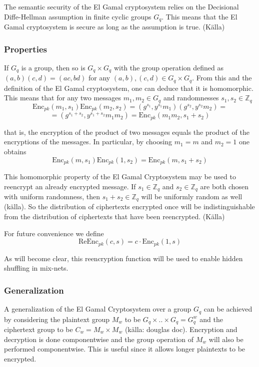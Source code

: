 The semantic security of the El Gamal cryptosystem relies on the
Decisional Diffe-Hellman assumption in finite cyclic groups
$G_q$. This means that the El Gamal cryptosystem is secure as long as
the assumption is true. (Källa)

\subsubsection{Properties}
If $G_q$ is a group, then so is $G_q \times G_q$ with the group
operation defined as $(a,b)(c,d) = (a c, b d)$ for any $(a,b),(c,d)
\in G_q \times G_q$. From this and the definition of the El Gamal
cryptosystem, one can deduce that it is homomorphic. This means that
for any two messages $m_1, m_2 \in G_q$ and randomnesses $s_1, s_2 \in
\mathbb{Z}_q$
$$
 \mathrm{Enc}_{pk}(m_1, s_1)\mathrm{Enc}_{pk}(m_2, s_2) =
(g^{s_1}, y^{s_1}m_1)(g^{s_2},y^{s_2}m_2) =
$$
$$
= (g^{s_1 + s_2}, y^{s_1 + s_2}m_1m_2) = \mathrm{Enc}_{pk}(m_1m_2, s_1 + s_2)
$$

that is, the encryption of the product of two messages equals the
product of the encryptions of the messages. In particular, by choosing
$m_1 = m$ and $m_2 = 1$ one obtains
$$
\mathrm{Enc}_{pk}(m, s_1) \mathrm{Enc}_{pk}(1, s_2) = \mathrm{Enc}_{pk}(m, s_1 + s_2)
$$

This homomorphic property of the El Gamal Cryptosystem may be used to
reencrypt an already encrypted message. If $s_1 \in \mathbb{Z}_q$ and
$s_2 \in \mathbb{Z}_q$ are both chosen with uniform randomness, then
$s_1 + s_2 \in \mathbb{Z}_q$ will be uniformly random as well
(källa). So the distribution of ciphertexts encrypted once
will be indistinguishable from the distribution of ciphertexts that
have been reencrypted. (Källa)

For future convenience we define
$$
\mathrm{ReEnc}_{pk}(c,s) = c \cdot \mathrm{Enc}_{pk}(1,s) 
$$

As will become clear, this reencryption function will be used to
enable hidden shuffling in mix-nets.

\subsubsection{Generalization}
A generalization of the El Gamal Cryptosystem over a group $G_q$ can
be achieved by considering the plaintext group $M_w$ to be $G_q \times
.. \times G_q = G_q^w$ and the ciphertext group to be $C_w = M_w
\times M_w$ (källa: douglas doc). Encryption and decryption is done
componentwise and the group operation of $M_w$ will also be performed
componentwise. This is useful since it allows longer plaintexts to be
encrypted.
